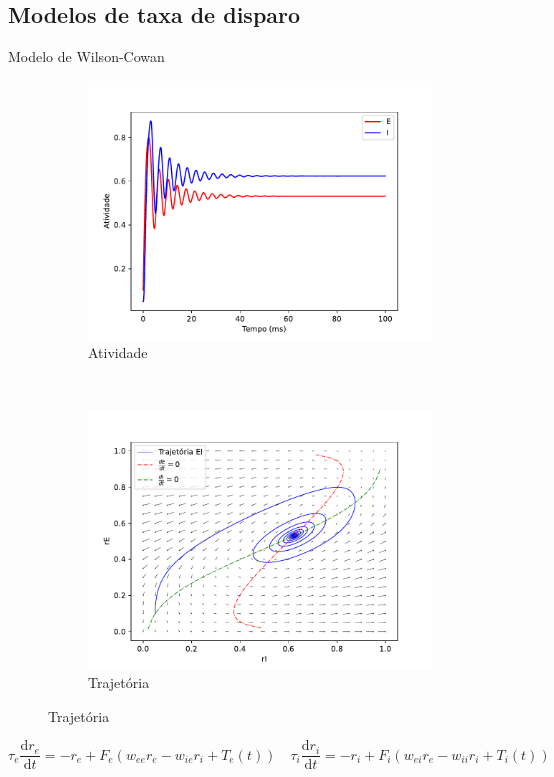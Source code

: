 \subsection{Modelos de taxa de disparo}
\begin{frame}{Modelo de Wilson-Cowan}
	\begin{figure}
		\centering
		\caption{Comportamento das simulações do modelo de Wilson-Cowan}
		\label{fig:wilson_cowan}
		\begin{subfigure}[b]{0.3\linewidth}
			\caption{Atividade}
			\label{fig:ww_atividade}
			\includegraphics[width=\textwidth]{figs/ww_atividade}
		\end{subfigure}
		~
		\begin{subfigure}[b]{0.3\linewidth}
			\caption{Trajetória}
			\label{fig:ww_trajetoria}
			\includegraphics[width=\textwidth]{figs/ww_trajetoria}
		\end{subfigure}
	\end{figure}
	\[
		\tau_e\frac{\mathrm{d}r_e}{\mathrm{d}t} =-r_e+F_e(w_{ee}r_e-w_{ie}r_i+T_e(t))
		\quad
		\tau_i\frac{\mathrm{d}r_i}{\mathrm{d}t} =-r_i+F_i(w_{ei}r_e-w_{ii}r_i+T_i(t))
	\]
\end{frame}

